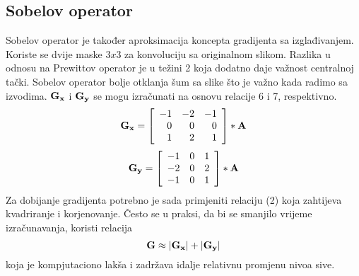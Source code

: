 ﻿\documentclass[conference]{IEEEtran}
\begin{document}
\subsection{Sobelov operator}
Sobelov operator je također  aproksimacija koncepta
gradijenta sa izglađivanjem. Koriste se dvije maske $3x3$ za konvoluciju  sa originalnom slikom. Razlika u odnosu na Prewittov operator je u težini 2 koja dodatno daje važnost centralnoj tački. Sobelov operator bolje otklanja šum sa slike što je važno kada radimo sa izvodima. $\bold{G_x}$ i $\bold{G_y}$ se mogu izračunati na osnovu relacije 6 i 7, respektivno. 
\begin{equation}
\bold{G_x}=
\begin{bmatrix}
\begin{array}{rrrr}
-1     & -2     & -1 \\ 
0   & 0               &  0 \\ 
1  & 2  & 1\\ 
\end{array}
\end{bmatrix}*\bold{A} 
\end{equation}
\begin{equation}
\bold{G_y}=
\begin{bmatrix}
\begin{array}{rrrr}
-1     & 0     & 1 \\ 
-2   & 0               &  2 \\ 
-1  & 0  & 1\\ 
\end{array}
\end{bmatrix}*\bold{A} 
\end{equation}
Za dobijanje gradijenta potrebno je sada primjeniti relaciju (2) koja zahtijeva kvadriranje i korjenovanje. Često se u praksi, da bi se smanjilo vrijeme izračunavanja, koristi relacija 
\begin{equation}
    \bold{G} \approx  |\bold{G_x}| + |\bold{G_y}|
\end{equation}
koja je kompjutaciono lakša i zadržava idalje relativnu promjenu nivoa sive.
\end{document}
